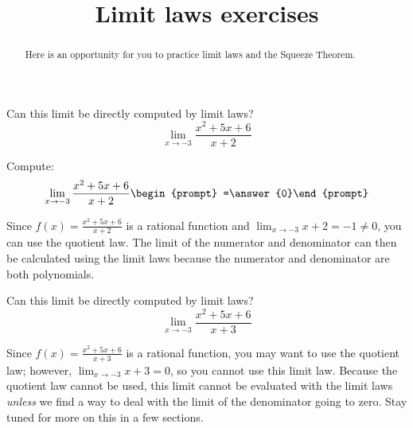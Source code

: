 \documentclass[handout]{ximera}
\title{Limit laws exercises}
\begin{document}
\begin{abstract}
Here is an opportunity for you to practice limit laws and the Squeeze Theorem.
\end{abstract}
\maketitle

\begin{exercise}
  Can this limit be directly computed by limit laws?
  \[
  \displaystyle\lim_{x\to -3}\frac{x^2+5x+6}{x+2} 
  \]
  \begin{multipleChoice}
  \end{multipleChoice}
  \begin{question}
    Compute:
    \[
    \displaystyle\lim_{x\to -3}\frac{x^2+5x+6}{x+2} \begin{prompt} =\answer{0}\end{prompt}
    \]
    \begin{feedback}
      Since $f(x)=\frac{x^2+5x+6}{x+2}$ is a rational function and
      $\displaystyle\lim_{x\to -3} x+2 =-1 \neq 0$, you can use the quotient law.  The limit of the numerator and denominator can then be calculated using the limit laws because the numerator and denominator are both polynomials. 
    \end{feedback}
  \end{question}
\end{exercise}

\begin{exercise}
  Can this limit be directly computed by limit laws?
  \[
  \displaystyle\lim_{x\to -3}\frac{x^2+5x+6}{x+3} 
  \]
  \begin{multipleChoice}
    
    \begin{feedback}[correct]
      Since $f(x)=\frac{x^2+5x+6}{x+3}$ is a rational function, you may want to use the quotient law; however, $\displaystyle\lim_{x\to -3} x+3 = 0$, so you cannot use this limit law.  Because the quotient law cannot be used, this limit cannot be evaluated with the limit laws \textit{unless} we find a way to deal with the limit of the denominator going to zero.  Stay tuned for more on this in a few sections.
    \end{feedback}
    
  \end{multipleChoice}

\end{exercise}
\end{document}
